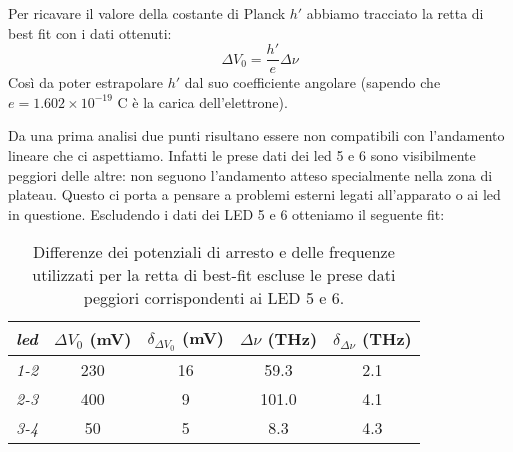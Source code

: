 \documentclass[9pt,a4paper,twocolumn,twoside]{tau-class/tau}
\begin{document}
Per ricavare il valore della costante di Planck \(h'\) abbiamo tracciato la retta di best fit con i dati ottenuti:
\[
\Delta V_0 = \frac{h'}{e}\Delta\nu
\]
 Così da poter estrapolare \(h'\) dal suo coefficiente angolare (sapendo che \(e = 1.602\times 10^{-19}\) C è la carica dell'elettrone). 

Da una prima analisi due punti risultano essere non compatibili con l'andamento lineare che ci aspettiamo. Infatti le prese dati dei led 5 e 6 sono visibilmente peggiori delle altre: non seguono l'andamento atteso specialmente nella zona di plateau. Questo ci porta a pensare a problemi esterni legati all'apparato o ai led in questione. Escludendo i dati dei LED 5 e 6 otteniamo il seguente fit:

\begin{table}[H]
            \centering
            \begin{tabular}{lcccc}
                \toprule
                 \textit{led}&\(\Delta V_0\) (mV) & \(\delta_{\Delta V_0}\) (mV) & \(\Delta\nu\) (THz) &  \(\delta_{\Delta \nu}\) (THz)\\
                \midrule
                \textit{1-2} &230 & 16 & 59.3& 2.1 \\
                \textit{2-3} &400 & 9  & 101.0 & 4.1 \\
                \textit{3-4} &50 & 5  & 8.3&  4.3 \\
                \bottomrule  
            \end{tabular}
            \caption{Differenze dei potenziali di arresto e delle frequenze utilizzati per la retta di best-fit escluse le prese dati peggiori corrispondenti ai LED 5 e 6.}
\end{table}
\end{document}
